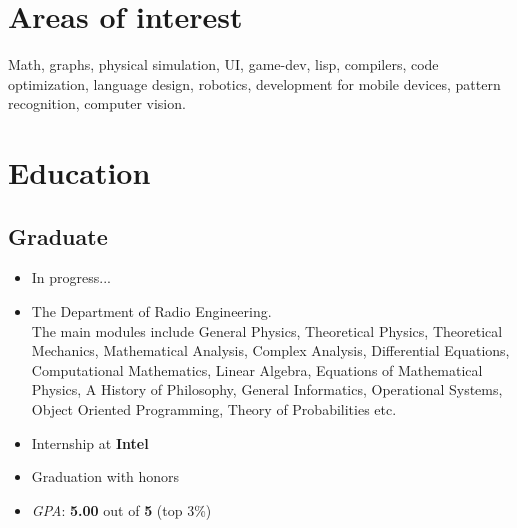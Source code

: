 \documentclass[letterpaper]{resume}
\begin{document}
\author{Arseniy Y Zaostrovnykh}
\maketitle

\section{Areas of interest}
Math, graphs, physical simulation, UI, game-dev, lisp, compilers, code optimization, language design, robotics, development for mobile devices, pattern recognition, computer vision.

\section{Education}

\subsection{Graduate}

\begin{itemize}
	\item In progress...
\end{itemize}

\begin{itemize}

	\item The Department of Radio Engineering.\\ The main modules include General Physics,
Theoretical Physics, Theoretical Mechanics, Mathematical Analysis, Complex Analysis, Differential Equations, Computational Mathematics, Linear Algebra, Equations of Mathematical Physics, A History of Philosophy, General Informatics, Operational Systems, Object Oriented Programming, Theory of Probabilities etc.
\item Internship at {\bf Intel}
\item Graduation with honors
\item \emph{GPA}: {\bf 5.00} out of {\bf 5} (top 3\%)
\end{itemize}
\end{document}

